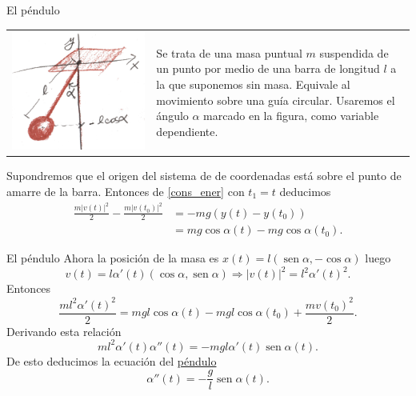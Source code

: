 \documentclass[handout,hyperref={colorlinks=true}]{beamer}
\DeclareMathOperator{\sen}{sen}
\begin{document}
\begin{frame}{El péndulo}
\begin{tabular}{m{4cm} m{5.5cm}}
 \includegraphics[scale=.07]{imagenes/pendulo.jpg} & Se trata de una masa puntual $m$ suspendida de un punto por medio de una barra de longitud $l$
 a la que suponemos sin masa. Equivale al movimiento sobre una guía circular.  Usaremos el ángulo $\alpha$ marcado en la figura, como variable dependiente.
\end{tabular}
Supondremos que el origen del sistema de de coordenadas está sobre el punto de amarre de la barra. Entonces de \eqref{cons_ener} con $t_1=t$ deducimos 
\[\begin{split}\frac{m|v(t)|^2}{2}-\frac{m|v(t_0)|^2}{2}&=-mg\left(y(t)-y(t_0)\right)\\
  &=mg\cos\alpha(t)-mg\cos\alpha(t_0).
   \end{split}
\]
\end{frame}


\begin{frame}{El péndulo}
Ahora la posición de la masa es $x(t)=l(\sen\alpha,-\cos\alpha)$ luego 
\[v(t)=l\alpha'(t)(\cos\alpha,\sen\alpha) \Longrightarrow |v(t)|^2=l^2\alpha'(t)^2.\]
Entonces
\[\frac{ml^2\alpha'(t)^2}{2}= mgl\cos\alpha(t)-mgl\cos\alpha(t_0) +\frac{mv(t_0)^2}{2}.\]
Derivando esta relación
\[ml^2\alpha'(t)\alpha''(t)=-mgl\alpha'(t)\sen\alpha(t).\]
De esto deducimos la ecuación del \href{http://es.wikipedia.org/wiki/Péndulo}{péndulo}
\[\boxed{\alpha''(t)=-\frac{g}{l}\sen\alpha(t)}.\]
\end{frame}
\end{document}
